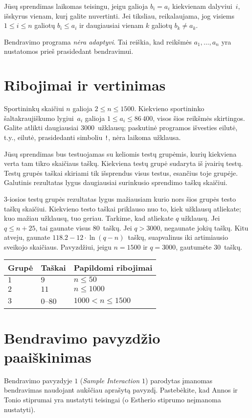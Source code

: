 Jūsų sprendimas laikomas teisingu, jeigu galioja $b_i=a_i$ kiekvienam dalyviui~$i$, išskyrus vienam, 
kurį galite nuvertinti.
Jei tiksliau, reikalaujama, jog visiems $1\leq i\leq n$ galiotų $b_i\leq a_i$
ir daugiausiai vienam $k$ galiotų $b_k \neq a_k$.

Bendravimo programa \emph{nėra adaptyvi}. Tai reiškia, kad reikšmės $a_1,\ldots, a_n$ yra nustatomos prieš prasidedant bendravimui.

\section*{Ribojimai ir vertinimas}

Sportininkų skaičiui $n$ galioja
$2\leq n\leq 1500$. %
Kiekvieno sportininko šaltakraujiškumo lygiui~$a_i$ galioja 
$1\leq a_i\leq 86\,400$, %
visos šios reikšmės skirtingos. %
Galite atlikti daugiausiai $3000$~užklausų; %
paskutinė programos išvesties eilutė, t.y., eilutė, prasidedanti simboliu \texttt{!}, nėra laikoma užklausa.

Jūsų sprendimas bus testuojamas su keliomis testų grupėmis, kurių kiekviena verta tam tikro skaičiaus taškų.
Kiekviena testų grupė sudaryta iš įvairių testų.
Testų grupės taškai skiriami tik išsprendus visus testus, esančius toje grupėje.
Galutinis rezultatas lygus daugiausiai surinkusio sprendimo taškų skaičiui.

$3$-iosios testų grupės rezultatas lygus mažiausiam kurio nors šios grupės testo taškų skaičiui.
Kiekvieno testo taškai priklauso nuo to, kiek užklausų atliekate;
kuo mažiau užklausų, tuo geriau.
Tarkime, kad atliekate $q$ užklausų. 
Jei $q \le n+25$, tai gaunate visus $80$~taškų. 
Jei $q > 3000$, negaunate jokių taškų.
Kitu atveju, gaunate 
$118.2 - 12 \cdot \ln(q - n)$~taškų, suapvalinus iki artimiausio sveikojo skaičiaus. %
Pavyzdžiui, jeigu $n = 1500$ ir $q = 3000$, gautumėte $30$~taškų.

\medskip
\begin{tabular}{lll}
Grupė & Taškai & Papildomi ribojimai\\\hline
$1$  &  $9$ & $n\leq 50$\\
$2$  &  $11$ & $n\leq 1000$\\
$3$  &  $0$--$80$ & $1000 < n\leq 1500$\\
\end{tabular}

\section*{Bendravimo pavyzdžio paaiškinimas}

Bendravimo pavyzdyje $1$ (\emph{Sample Interaction $1$}) parodytas įmanomas bendravimas naudojant aukščiau aprašytą pavyzdį.
Pastebėkite, kad Annos ir Tonio stiprumai yra nustatyti teisingai (o Estherio stiprumo neįmanoma nustatyti).
